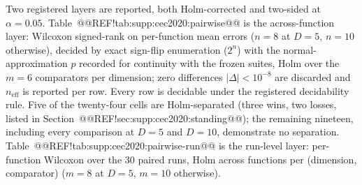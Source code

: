 \documentclass[10pt,a4paper]{article}
\begin{document}
Two registered layers are reported, both Holm-corrected and two-sided at
$\alpha = 0.05$.  Table~@@REF!tab:supp:cec2020:pairwise@@ is the
across-function layer: Wilcoxon signed-rank on per-function mean errors
($n = 8$ at $D = 5$, $n = 10$ otherwise), decided by exact sign-flip
enumeration ($2^{n}$) with the normal-approximation $p$ recorded for
continuity with the frozen suites, Holm over the $m = 6$ comparators per
dimension; zero differences $|\Delta| < 10^{-8}$ are discarded and
$n_{\mathrm{eff}}$ is reported per row.  Every row is decidable under
the registered decidability rule.  Five of the twenty-four cells are
Holm-separated (three wins, two losses, listed in
Section~@@REF!sec:supp:cec2020:standing@@); the remaining nineteen,
including every comparison at $D = 5$ and $D = 10$, demonstrate no
separation.  Table~@@REF!tab:supp:cec2020:pairwise-run@@ is the run-level
layer: per-function Wilcoxon over the 30 paired runs, Holm across
functions per (dimension, comparator) ($m = 8$ at $D = 5$, $m = 10$
otherwise).
\end{document}
